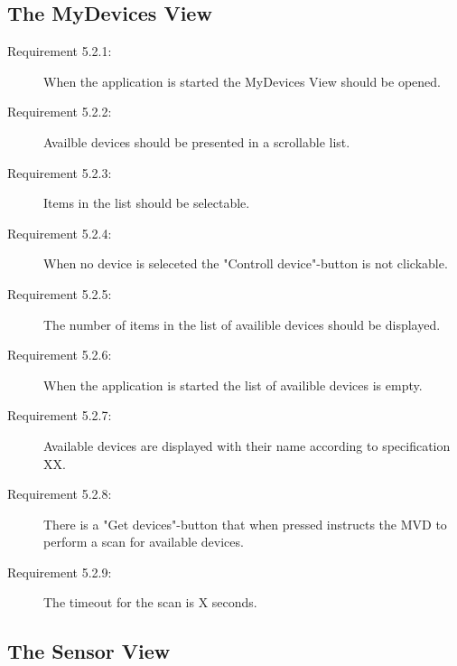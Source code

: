 \documentclass[a4paper]{article}
\begin{document}
\subsection{The MyDevices View}
\begin{description}
\item[Requirement 5.2.1:] When the application is started the MyDevices View should be opened.

\item[Requirement 5.2.2:] Availble devices should be presented in a scrollable list.

\item[Requirement 5.2.3:] Items in the list should be selectable.

\item[Requirement 5.2.4:] When no device is seleceted the "Controll device"-button is not clickable. 

\item[Requirement 5.2.5:] The number of items in the list of availible devices should be displayed.

\item[Requirement 5.2.6:] When the application is started the list of availible devices is empty.

\item[Requirement 5.2.7:] Available devices are displayed with their name according to specification XX.

\item[Requirement 5.2.8:] There is a "Get devices"-button that when pressed instructs the MVD to perform a scan for available devices.

\item[Requirement 5.2.9:] The timeout for the scan is X seconds. 

\end{description}

\subsection{The Sensor View}
\end{document}

